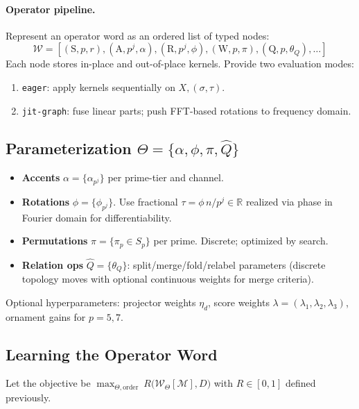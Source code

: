 \documentclass[12pt]{article}
\numberwithin{equation}{section}
\theoremstyle{plain}
\theoremstyle{definition}
\theoremstyle{remark}
\begin{document}
\paragraph{Operator pipeline.}
Represent an operator word as an ordered list of typed nodes:
\[
\mathcal{W}=[(\mathrm{S},p,r),(\mathrm{A},p^j,\alpha),(\mathrm{R},p^j,\phi),(\mathrm{W},p,\pi),(\mathrm{Q},p,\theta_Q),\dots]
\]
Each node stores in-place and out-of-place kernels. Provide two evaluation modes:
\begin{enumerate}
  \item \texttt{eager}: apply kernels sequentially on \(X,(\sigma,\tau)\).
  \item \texttt{jit-graph}: fuse linear parts; push FFT-based rotations to frequency domain.
\end{enumerate}

\subsection*{Parameterization \(\Theta=\{\alpha,\phi,\pi,\hat{Q}\}\)}
\begin{itemize}
  \item \textbf{Accents} \(\alpha=\{\alpha_{p^j}\}\) per prime-tier and channel.
  \item \textbf{Rotations} \(\phi=\{\phi_{p^j}\}\). Use fractional \(\tau=\phi\,n/p^j\in\mathbb{R}\) realized via phase in Fourier domain for differentiability.
  \item \textbf{Permutations} \(\pi=\{\pi_p\in S_p\}\) per prime. Discrete; optimized by search.
  \item \textbf{Relation ops} \(\hat{Q}=\{\theta_Q\}\): split/merge/fold/relabel parameters (discrete topology moves with optional continuous weights for merge criteria).
\end{itemize}
Optional hyperparameters: projector weights \(\eta_d\), score weights \(\lambda=(\lambda_1,\lambda_2,\lambda_3)\), ornament gains for \(p=5,7\).

\subsection*{Learning the Operator Word}
Let the objective be \(\max_{\Theta,\text{order}}\ R\big(\mathcal{W}_\Theta[\mathcal{M}],D\big)\) with \(R\in[0,1]\) defined previously.
\end{document}
